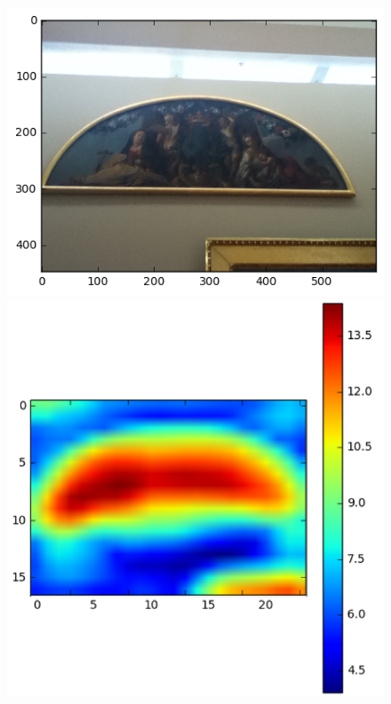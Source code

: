 \begin{figure}[!htb]
  \centering
  \begin{minipage}[c]{.33\linewidth}
    \includegraphics[width=\textwidth]{figures/sample1_10A-0519.png}
  \end{minipage} \hfill
  \begin{minipage}[c]{.33\linewidth}
    \includegraphics[width=\textwidth]{figures/sample1heatmap.png}

\end{minipage}
\end{figure}
